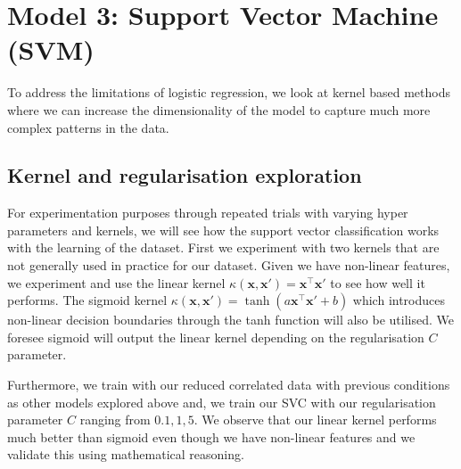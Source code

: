 \documentclass[10pt,twocolumn]{article}
\begin{document}
\clearpage
\section{Model 3: Support Vector Machine (SVM)}
To address the limitations of logistic regression, we look at kernel based methods where we can increase the dimensionality of the model to capture much more complex patterns in the data.

\subsection{Kernel and regularisation exploration}
For experimentation purposes through repeated trials with varying hyper parameters and kernels, we will see how the support vector classification works with the learning of the dataset. 
First we experiment with two kernels that are not generally used in practice for our dataset. Given we have non-linear features, we experiment and use the linear kernel $\kappa(\mathbf{x},\mathbf{x'}) = \mathbf{x}^\top \mathbf{x'}$ to see how well it performs. The sigmoid kernel $\kappa(\mathbf{x}, \mathbf{x}') = \tanh\left(a \mathbf{x}^\top \mathbf{x}' + b\right)$ which introduces non-linear decision boundaries through the tanh function will also be utilised. We foresee sigmoid will output the linear kernel depending on the regularisation $C$ parameter.

Furthermore, we train with our reduced correlated data with previous conditions as other models explored above and, we train our SVC with our regularisation parameter $C$ ranging from $0.1,1,5$. We observe that our linear kernel performs much better than sigmoid even though we have non-linear features and we validate this using mathematical reasoning.
\end{document}
